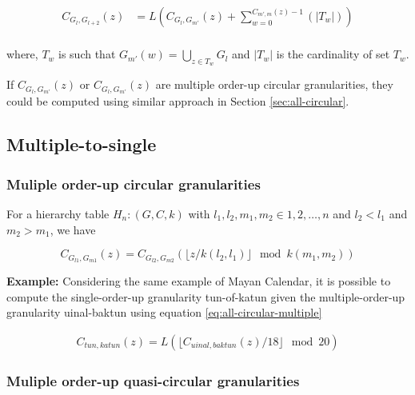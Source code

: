 \documentclass[12pt]{article}
\begin{document}
\begin{equation} \label{eq:multifromsingle-quasi2}
\begin{split}
C_{G_l,G_{l+2}}(z) & = L(C_{G_{l},G_{m'}}(z) + \sum_{w=0}^{C_{m',m}(z) -1}(\vert T_{w} \vert))\\
\end{split}
\end{equation}

where, \(T_w\) is such that \(G_{m'}(w) = \bigcup_{z \in T_w}G_{l}\) and \(\vert T_w \vert\) is the cardinality of set \(T_w\).

If \(C_{G_{l},G_{m'}}(z)\) or \(C_{G_{l},G_{m'}}(z)\) are multiple order-up circular granularities, they could be computed using similar approach in Section \ref{sec:all-circular}.

\hypertarget{sec:multiple-to-single}{%
\subsection{Multiple-to-single}\label{sec:multiple-to-single}}

\hypertarget{sec:all-circular-multiple}{%
\subsubsection{Muliple order-up circular granularities}\label{sec:all-circular-multiple}}

For a hierarchy table \(H_n: (G, C, k)\) with \(l_1, l_2, m_1, m_2 \in {1, 2, \dots, n}\) and \(l_2<l_1\) and \(m_2>m_1\), we have

\begin{equation} \label{eq:all-circular-multiple}
C_{G_{l1}, G_{m1}}(z) = C_{G_{l2}, G_{m2}}(\lfloor z/k(l_2,l_1) \rfloor\mod k(m_1, m_2))
\end{equation}

\textbf{Example:} Considering the same example of Mayan Calendar, it is possible to compute the single-order-up granularity tun-of-katun given the multiple-order-up granularity uinal-baktun using equation \ref{eq:all-circular-multiple}

\begin{equation} \label{eq10}
\begin{split}
C_{tun, katun}(z) =  L(\lfloor C_{uinal, baktun}(z)/18\rfloor \mod 20) 
\end{split}
\end{equation}

\hypertarget{sec:quasi-circular-multiple}{%
\subsubsection{Muliple order-up quasi-circular granularities}\label{sec:quasi-circular-multiple}}
\end{document}
